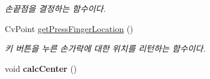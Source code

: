 \begin{DoxyCompactItemize}
\begin{DoxyCompactList}\small\item\em 손끝점을 결정하는 함수이다. \end{DoxyCompactList}\item 
\hypertarget{class_fk_hand_a9483f07c996ddb56aad41552d1008215}{}Cv\+Point \hyperlink{class_fk_hand_a9483f07c996ddb56aad41552d1008215}{get\+Press\+Finger\+Location} ()\label{class_fk_hand_a9483f07c996ddb56aad41552d1008215}

\begin{DoxyCompactList}\small\item\em 키 버튼을 누른 손가락에 대한 위치를 리턴하는 함수이다. \end{DoxyCompactList}\item 
\hypertarget{class_fk_hand_a752028b1dc81381bcbf0397856797fea}{}void {\bfseries calc\+Center} ()\label{class_fk_hand_a752028b1dc81381bcbf0397856797fea}

\end{DoxyCompactItemize}
